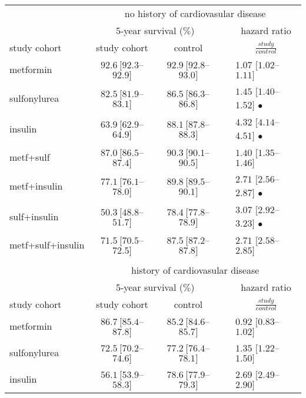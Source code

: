 \begin{table}[!h]
\begin{tabular}{lcccl}
\toprule
			 & \multicolumn{4}{c}{no history of cardiovasular disease}		 \\\cline{2-5} 
			 & \multicolumn{2}{c}{5-year survival ($\%$)} 		& & \multicolumn{1}{c}{hazard ratio} \\\cline{2-3} \cline{5-5}
study cohort	& study cohort 				& control 	&	& \multicolumn{1}{c}{$\frac{study}{control}$} \\
\midrule

metformin 				 & $92.6\ [92.3$--$92.9]$ & $92.9\ [92.8$--$93.0]$ & & $1.07$ $[1.02$--$1.11]$ \\
sulfonylurea 			& $82.5\ [81.9$--$83.1]$ & $86.5\ [86.3$--$86.8]$ & & $1.45$ $[1.40$--$1.52]$ $\bullet$ \\
insulin					& $63.9\ [62.9$--$64.9]$ & $88.1\ [87.8$--$88.3]$ & & $4.32$ $[4.14$--$4.51]$ $\bullet$ \\

metf+sulf				& $87.0\ [86.5$--$87.4]$ & $90.3\ [90.1$--$90.5]$ & & $1.40$ $[1.35$--$1.46]$ \\
metf+insulin			& $77.1\ [76.1$--$78.0]$ & $89.8\ [89.5$--$90.1]$ & & $2.71$ $[2.56$--$2.87]$ $\bullet$ \\
sulf+insulin			& $50.3\ [48.8$--$51.7]$ & $78.4\ [77.8$--$78.9]$ & & $3.07$ $[2.92$--$3.23]$ $\bullet$ \\
metf+sulf+insulin		& $71.5\ [70.5$--$72.5]$ & $87.5\ [87.2$--$87.8]$ & & $2.71$ $[2.58$--$2.85]$ \\
& \\
			 & \multicolumn{4}{c}{history of cardiovasular disease}		 \\\cline{2-5} 
			 & \multicolumn{2}{c}{5-year survival ($\%$)} 		& & \multicolumn{1}{c}{hazard ratio} \\\cline{2-3} \cline{5-5}
study cohort	& study cohort 				& control 	&	& \multicolumn{1}{c}{$\frac{study}{control}$} \\
\midrule
metformin 				 & $86.7\ [85.4$--$87.8]$ & $85.2\ [84.6$--$85.7]$ & & $0.92$ $[0.83$--$1.02]$ \\ %
sulfonylurea 			        & $72.5\ [70.2$--$74.6]$ & $77.2\ [76.4$--$78.1]$ & & $1.35$ $[1.22$--$1.50]$ \\ %
insulin					& $56.1\ [53.9$--$58.3]$ & $78.6\ [77.9$--$79.3]$ & & $2.69$ $[2.49$--$2.90]$ \\ %


\end{tabular}
\end{table}
